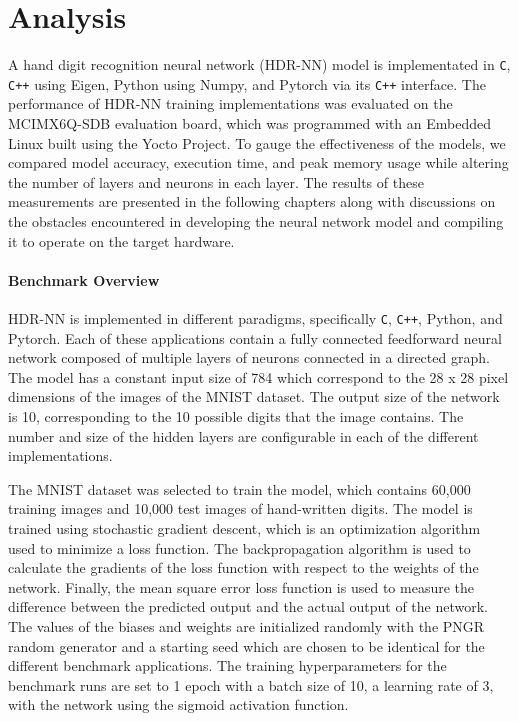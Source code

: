 \part{Analysis}

A hand digit recognition neural network (HDR-NN) model is implementated in \texttt{C}, \texttt{C++} using Eigen, Python using Numpy, and Pytorch via its \texttt{C++} interface. The performance of HDR-NN training implementations was evaluated on the MCIMX6Q-SDB evaluation board, which was programmed with an Embedded Linux built using the Yocto Project. To gauge the effectiveness of the models, we compared model accuracy, execution time, and peak memory usage while altering the number of layers and neurons in each layer. The results of these measurements are presented in the following chapters along with discussions on the obstacles encountered in developing the neural network model and compiling it to operate on the target hardware.

\subsection*{Benchmark Overview}

HDR-NN is implemented in different paradigms, specifically \texttt{C}, \texttt{C++}, Python, and Pytorch. Each of these applications contain a fully connected feedforward neural network composed of multiple layers of neurons connected in a directed graph. The model has a constant input size of 784 which correspond to the 28 x 28 pixel dimensions of the images of the MNIST dataset. The output size of the network is 10, corresponding to the 10 possible digits that the image contains. The number and size of the hidden layers are configurable in each of the different implementations.

The MNIST dataset was selected to train the model, which contains 60,000 training images and 10,000 test images of hand-written digits. The model is trained using stochastic gradient descent, which is an optimization algorithm used to minimize a loss function. The backpropagation algorithm is used to calculate the gradients of the loss function with respect to the weights of the network. Finally, the mean square error loss function is used to measure the difference between the predicted output and the actual output of the network. The values of the biases and weights are initialized randomly with the PNGR random generator and a starting seed which are chosen to be identical for the different benchmark applications. The training hyperparameters for the benchmark runs are set to 1 epoch with a batch size of 10, a learning rate of 3, with the network using the sigmoid activation function.

